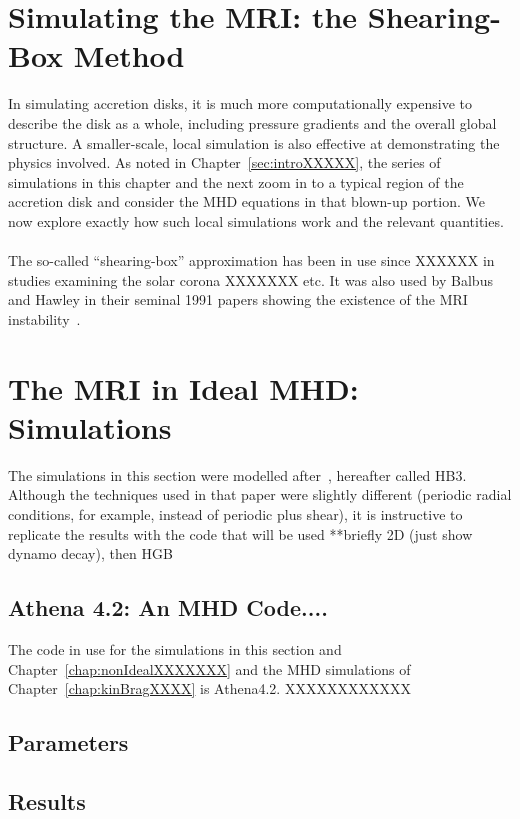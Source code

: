 \section{Simulating the MRI: the Shearing-Box Method} \label{sec:mrisbideal}
In simulating accretion disks, it is much more computationally expensive to describe the disk as a whole, including pressure gradients and the overall global structure. A smaller-scale, local simulation is also effective at demonstrating the physics involved. As noted in Chapter~\ref{sec:introXXXXX}, the series of simulations in this chapter and the next zoom in to a typical region of the accretion disk and consider the MHD equations in that blown-up portion. We now explore exactly how such local simulations work and the relevant quantities.\\
\\
The so-called ``shearing-box'' approximation has been in use since XXXXXX in studies examining the solar corona XXXXXXX etc. It was also used by Balbus and Hawley in their seminal 1991 papers showing the existence of the MRI instability~\cite{BH1991a, BH1991b, BH1991c}. 


\section{The MRI in Ideal MHD: Simulations} \label{sec:mrisimideal}
The simulations in this section were modelled after~\cite{XXXXXXBH1991c}, hereafter called HB3. Although the techniques used in that paper were slightly different (periodic radial conditions, for example, instead of periodic plus shear), it is instructive to replicate the results with the code that will be used
**briefly 2D (just show dynamo decay), then HGB

\subsection{Athena 4.2: An MHD Code....}
The code in use for the simulations in this section and Chapter~\ref{chap:nonIdealXXXXXXX} and the MHD simulations of Chapter~\ref{chap:kinBragXXXX} is Athena4.2. XXXXXXXXXXXX

\subsection{Parameters}

\subsection{Results}

